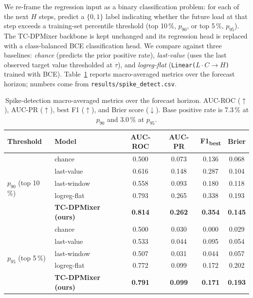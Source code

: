 \documentclass{article}
\begin{document}
We re-frame the regression input as a binary classification problem:
for each of the next $H$ steps, predict a $\{0, 1\}$ label
indicating whether the future load at that step exceeds a
training-set percentile threshold (top 10\,\%, $p_{90}$, or top
5\,\%, $p_{95}$). The TC-DPMixer backbone is kept unchanged and its
regression head is replaced with a class-balanced BCE classification
head. We compare against three baselines: \emph{chance} (predicts
the prior positive rate), \emph{last-value} (uses the last observed
target value thresholded at $\tau$), and \emph{logreg-flat}
(\texttt{Linear($L \cdot C \to H$)} trained with BCE).
Table~\ref{tab:spike} reports macro-averaged metrics over the
forecast horizon; numbers come from
\texttt{results/spike\_detect.csv}.

\begin{table}[h]
  \centering
  \small
  \caption{Spike-detection macro-averaged metrics over the forecast
    horizon. AUC-ROC ($\uparrow$), AUC-PR ($\uparrow$), best F1
    ($\uparrow$), and Brier score ($\downarrow$). Base positive rate
    is 7.3\,\% at $p_{90}$ and 3.0\,\% at $p_{95}$.}
  \label{tab:spike}
  \begin{tabular}{llcccc}
    \toprule
    Threshold & Model & AUC-ROC & AUC-PR & F1\textsubscript{best} & Brier \\
    \midrule
    \multirow{5}{*}{$p_{90}$ (top 10\,\%)}
      & chance        & 0.500 & 0.073 & 0.136 & 0.068 \\
      & last-value    & 0.616 & 0.148 & 0.287 & 0.104 \\
      & last-window   & 0.558 & 0.093 & 0.180 & 0.118 \\
      & logreg-flat   & 0.793 & 0.265 & 0.338 & 0.193 \\
      & \textbf{TC-DPMixer (ours)} & \textbf{0.814} & \textbf{0.262} & \textbf{0.354} & \textbf{0.145} \\
    \midrule
    \multirow{5}{*}{$p_{95}$ (top 5\,\%)}
      & chance        & 0.500 & 0.030 & 0.000 & 0.029 \\
      & last-value    & 0.533 & 0.044 & 0.095 & 0.054 \\
      & last-window   & 0.507 & 0.031 & 0.044 & 0.057 \\
      & logreg-flat   & 0.772 & 0.099 & 0.172 & 0.202 \\
      & \textbf{TC-DPMixer (ours)} & \textbf{0.791} & \textbf{0.099} & \textbf{0.171} & \textbf{0.193} \\
    \bottomrule
  \end{tabular}
\end{table}
\end{document}

